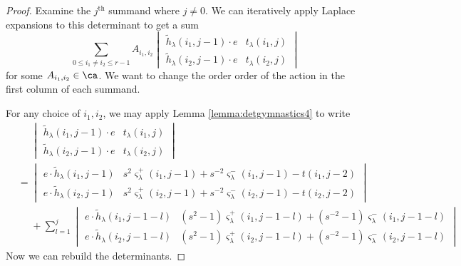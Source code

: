 \begin{proof}
Examine the $j^{\textrm{th}}$ summand where $j \neq 0$. We can iteratively apply Laplace expansions to this determinant to get a sum
\[
\sum_{0 \leq i_1 \neq i_2 \leq r-1} A_{i_1, i_2} 
\begin{vmatrix}
\tilde{h}_\lambda (i_1, j-1)\cdot e & t_\lambda (i_1, j) \\
\tilde{h}_\lambda (i_2, j-1)\cdot e & t_\lambda (i_2, j)
\end{vmatrix} 
\]
for some $A_{i_1, i_2} \in \ca$. We want to change the order order of the action in the first column of each summand.

For any choice of $i_1, i_2$, we may apply Lemma \ref{lemma:detgymnastics4} to write
\begin{align*}
& \quad \,\,
\begin{vmatrix}
\tilde{h}_\lambda (i_1, j-1)\cdot e & t_\lambda (i_1, j) \\
\tilde{h}_\lambda (i_2, j-1)\cdot e & t_\lambda (i_2, j)
\end{vmatrix} \\
&=
\begin{vmatrix}
e \cdot \tilde{h}_\lambda (i_1, j-1) & s^2 \varsigma_\lambda^+ (i_1, j-1) + s^{-2} \varsigma_\lambda^- (i_1, j-1) - t(i_1, j-2) \\
e \cdot \tilde{h}_\lambda (i_2, j-1) & s^2 \varsigma_\lambda^+ (i_2, j-1) + s^{-2} \varsigma_\lambda^- (i_2, j-1) - t(i_2, j-2) 
\end{vmatrix}\\
&\quad\,\, +
\sum_{l=1}^{j}
\begin{vmatrix}
e \cdot \tilde{h}_\lambda(i_1, j-1-l) & (s^2 - 1) \varsigma_\lambda^+ (i_1, j-1-l) + (s^{-2} - 1) \varsigma_\lambda^- (i_1, j-1-l) \\
e \cdot \tilde{h}_\lambda(i_2, j-1-l) & (s^2 - 1) \varsigma_\lambda^+ (i_2, j-1-l) + (s^{-2} - 1) \varsigma_\lambda^- (i_2, j-1-l) 
\end{vmatrix}
\end{align*}
Now we can rebuild the determinants.
\end{proof}

